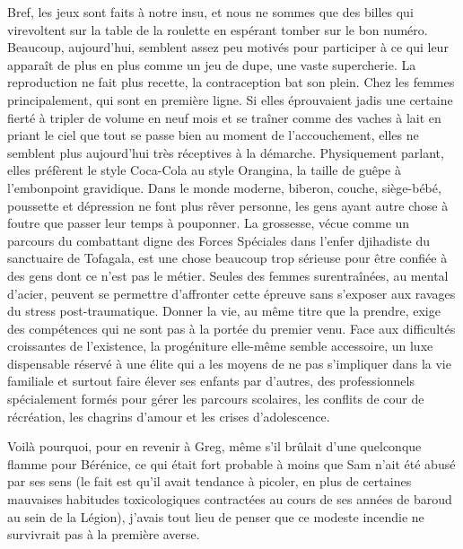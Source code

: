 \label{rat:53}%
Bref, les jeux sont faits à notre insu, et nous ne sommes que des billes qui virevoltent sur la table de la roulette en espérant tomber sur le bon numéro. Beaucoup, aujourd’hui, semblent assez peu motivés pour participer à ce qui leur apparaît de plus en plus comme un jeu de dupe, une vaste supercherie. La reproduction ne fait plus recette, la contraception bat son plein. Chez les femmes principalement, qui sont en première ligne. Si elles éprouvaient jadis une certaine fierté à tripler de volume en neuf mois et se traîner comme des vaches à lait en priant le ciel que tout se passe bien au moment de l’accouchement, elles ne semblent plus aujourd’hui très réceptives à la démarche. Physiquement parlant, elles préfèrent le style Coca-Cola au style Orangina, la taille de guêpe à l’embonpoint gravidique. Dans le monde moderne, biberon, couche, siège-bébé, poussette et dépression ne font plus rêver personne, les gens ayant autre chose à foutre que passer leur temps à pouponner. La grossesse, vécue comme un parcours du combattant digne des Forces Spéciales dans l’enfer djihadiste du sanctuaire de Tofagala, est une chose beaucoup trop sérieuse pour être confiée à des gens dont ce n’est pas le métier. Seules des femmes %
%
%
surentraînées, au mental d’acier, peuvent se permettre d’affronter cette épreuve sans s’exposer aux ravages du stress post-traumatique. Donner la vie, au même titre que la prendre, exige des compétences qui ne sont pas à la portée du premier venu. Face aux difficultés croissantes de l’existence, la progéniture elle-même semble accessoire, un luxe dispensable réservé à une élite qui a les moyens de ne pas s’impliquer dans la vie familiale et surtout faire élever ses enfants par d’autres, des professionnels spécialement formés pour gérer les parcours scolaires, les conflits de cour de récréation, les chagrins d’amour et les crises d’adolescence.

\illusloflabel{}%
Voilà pourquoi, pour en revenir à Greg, même s’il brûlait d’une quelconque flamme pour Bérénice, ce qui était fort probable à moins que Sam n’ait été abusé par ses sens (le fait est qu’il avait tendance à picoler, en plus de certaines mauvaises habitudes toxicologiques contractées au cours de ses années de baroud au sein de la Légion), j’avais tout lieu de penser que ce modeste incendie ne survivrait pas à la première averse.

